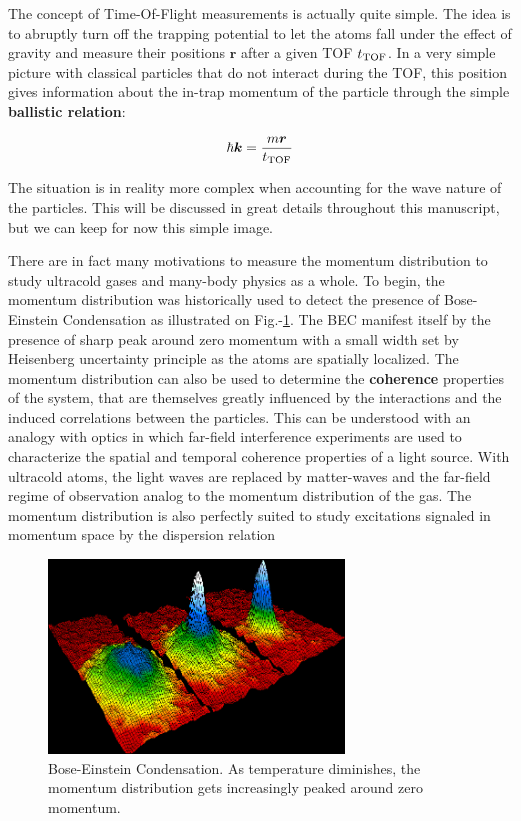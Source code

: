 The concept of Time-Of-Flight measurements is actually quite simple. The idea is to abruptly turn off the trapping potential to let the atoms fall under the effect of gravity and measure their positions $\bm{r}$ after a given TOF $t_{\rm{TOF}}$. In a very simple picture with classical particles that do not interact during the TOF, this position gives information about the in-trap momentum of the particle through the simple \textbf{ballistic relation}:

\begin{equation}
    \hbar \bm{k} = \frac{m \bm{r}}{t_{\rm{TOF}}}
\end{equation}

\noindent The situation is in reality more complex when accounting for the wave nature of the particles. This will be discussed in great details throughout this manuscript, but we can keep for now this simple image.

There are in fact many motivations to measure the momentum distribution to study ultracold gases and many-body physics as a whole. To begin, the momentum distribution was historically used to detect the presence of Bose-Einstein Condensation \cite{anderson1995observation,davis1995bose} as illustrated on Fig.-\ref{fig:1st_BEC}. The BEC manifest itself by the presence of sharp peak around zero momentum with a small width set by Heisenberg uncertainty principle as the atoms are spatially localized. The momentum distribution can also be used to determine the \textbf{coherence} properties of the system, that are themselves greatly influenced by the interactions and the induced correlations between the particles. This can be understood with an analogy with optics in which far-field interference experiments are used to characterize the spatial and temporal coherence properties of a light source. With ultracold atoms, the light waves are replaced by matter-waves and the far-field regime of observation analog to the momentum distribution of the gas. The momentum distribution is also perfectly suited to study excitations signaled in momentum space by the dispersion relation \nocite{refs}


\begin{figure}
    \centering
    \includegraphics[width=0.7\textwidth]{Fig/Intro/BEC.png}
    \caption{Bose-Einstein Condensation. As temperature diminishes, the momentum distribution gets increasingly peaked around zero momentum.}
    \label{fig:1st_BEC}
\end{figure}


